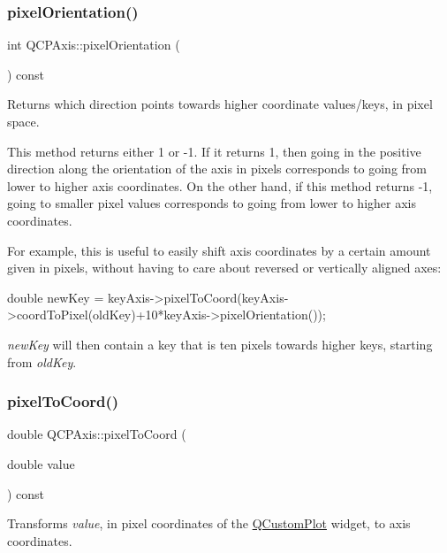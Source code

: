 \subsubsection{\texorpdfstring{pixel\+Orientation()}{pixelOrientation()}}
{\footnotesize\ttfamily int Q\+C\+P\+Axis\+::pixel\+Orientation (\begin{DoxyParamCaption}{ }\end{DoxyParamCaption}) const\hspace{0.3cm}{\ttfamily [inline]}}

Returns which direction points towards higher coordinate values/keys, in pixel space.

This method returns either 1 or -\/1. If it returns 1, then going in the positive direction along the orientation of the axis in pixels corresponds to going from lower to higher axis coordinates. On the other hand, if this method returns -\/1, going to smaller pixel values corresponds to going from lower to higher axis coordinates.

For example, this is useful to easily shift axis coordinates by a certain amount given in pixels, without having to care about reversed or vertically aligned axes\+:


\begin{DoxyCode}
\textcolor{keywordtype}{double} newKey = keyAxis->pixelToCoord(keyAxis->coordToPixel(oldKey)+10*keyAxis->pixelOrientation());
\end{DoxyCode}


{\itshape new\+Key} will then contain a key that is ten pixels towards higher keys, starting from {\itshape old\+Key}. \mbox{\label{classQCPAxis_a536ef8f624cac59b6b6fdcb495723c57}} 
\subsubsection{\texorpdfstring{pixel\+To\+Coord()}{pixelToCoord()}}
{\footnotesize\ttfamily double Q\+C\+P\+Axis\+::pixel\+To\+Coord (\begin{DoxyParamCaption}\item[{double}]{value }\end{DoxyParamCaption}) const}

Transforms {\itshape value}, in pixel coordinates of the \hyperlink{classQCustomPlot}{Q\+Custom\+Plot} widget, to axis coordinates. \mbox{\label{classQCPAxis_ac5e0f6f65c75efb5fd32275d6e4ef0d6}} 
